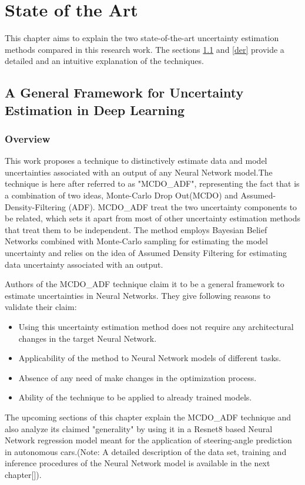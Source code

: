 

    \chapter{State of the Art}
	This chapter aims to explain the two state-of-the-art uncertainty estimation methods compared in this research work. The sections \ref{general_framework} and \ref{der} provide a detailed and an intuitive explanation of the techniques.
	
	\section{A General Framework for Uncertainty Estimation in Deep Learning}\label{general_framework}
	\subsection{Overview}\label{mcdo_adf_overview}
	This work proposes a technique to distinctively estimate data and model uncertainties associated with an output of any Neural Network model.The technique is here after referred to as "MCDO\_ADF", representing the fact that is a combination of two ideas, Monte-Carlo Drop Out(MCDO) and Assumed-Density-Filtering (ADF). MCDO\_ADF treat the  two uncertainty components to be related, which sets it apart from most of other uncertainty estimation methods that treat them to be independent. The method employs Bayesian Belief Networks combined with Monte-Carlo sampling for estimating the model uncertainty and relies on the idea of Assumed Density Filtering for  estimating data uncertainty associated with an output. 
	
	Authors of the MCDO\_ADF technique claim it to be a general framework to estimate uncertainties in Neural Networks. They give following reasons to validate their claim:
	\begin{itemize}
		\item Using this uncertainty estimation method does not require any architectural changes in the target Neural Network.
		\item Applicability of the method to Neural Network models of different tasks.
		\item Absence of any need of make changes in the optimization process.
		\item Ability of the technique to be applied to already trained models.
	\end{itemize}
	
	The upcoming sections of this chapter explain the MCDO\_ADF technique  and also analyze its claimed "generality" by using it in a Resnet8 based Neural Network regression model meant for the application of steering-angle prediction in autonomous cars.(Note: A detailed description of the data set, training and inference procedures of the Neural Network model is available in the next chapter[]).  
	
